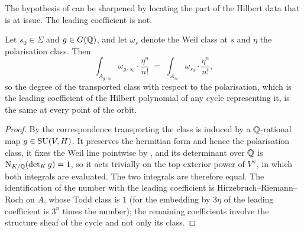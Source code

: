 The hypothesis of  can be sharpened by locating the
part of the Hilbert data that is at issue. The leading coefficient is not.

\begin{proposition}
\label{prop:leadingconstant}
Let $s_{0}\in\Sigma$ and $g\in G(\mathbb{Q})$, and let $\omega_{s}$ denote the Weil
class at $s$ and $\eta$ the polarisation class. Then
\[
  \int_{A_{g\cdot s_{0}}}\omega_{g\cdot s_{0}}\cdot\frac{\eta^{n}}{n!}
  \;=\;\int_{A_{s_{0}}}\omega_{s_{0}}\cdot\frac{\eta^{n}}{n!},
\]
so the degree of the transported class with respect to the polarisation, which
is the leading coefficient of the Hilbert polynomial of any cycle
representing it, is the same at every point of the orbit.
\end{proposition}

\begin{proof}
By  the correspondence transporting the class is induced
by a $\mathbb{Q}$-rational map $g\in\operatorname{SU}(V,H)$. It preserves the hermitian form and
hence the polarisation class, it fixes the Weil line pointwise by
, and its determinant over $\mathbb{Q}$ is
$\mathrm{N}_{K/\mathbb{Q}}(\det_{K}g)=1$, so it acts trivially on the top exterior power of
$V^{\vee}$, in which both integrals are evaluated. The two integrals are
therefore equal. The identification of the number with the leading
coefficient is Hirzebruch--Riemann--Roch on $A$, whose Todd class is $1$ (for
the embedding by $3\eta$ of  the leading coefficient is
$3^{n}$ times the number); the remaining coefficients involve the structure
sheaf of the cycle and not only its class.
\end{proof}

